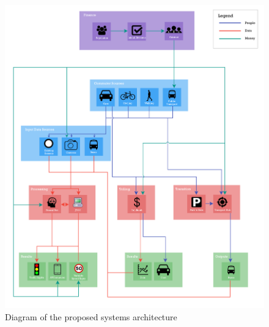 \documentclass[twoside, a4paper, 11pt]{article}
\begin{document}
\begin{figure}[H]
\centering
\includegraphics[width=\textwidth]{SystemsArchitectureNew.png}
\caption{Diagram of the proposed systems architecture}
\label{fig:san}
\end{figure}
\newpage
\end{document}
